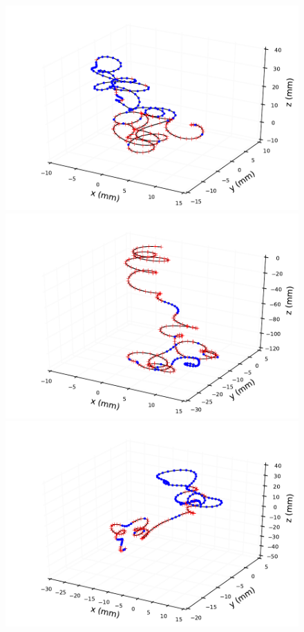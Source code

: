 \documentclass{JINST}
\begin{document}
\begin{figure}[!htb]
	\includegraphics[scale=0.48]{fig/plt_trkcurv_magbb05_ms13pt6_2.pdf}
	\includegraphics[scale=0.48]{fig/plt_trkcurv_magse05_ms27pt2_0.pdf}
	\includegraphics[scale=0.48]{fig/plt_trkcurv_magbb05_ms27pt2_2.pdf}

\end{figure}
\end{document}
